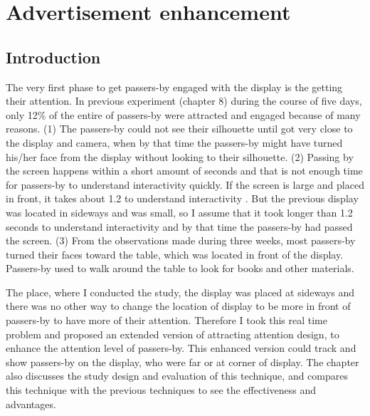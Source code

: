 \chapter{Advertisement enhancement} %

\label{Chapter9} %
\newpage

\section{Introduction}

The very first phase to get passers-by engaged with the display is the getting their attention. In previous experiment (chapter 8) during the course of five days, only 12\% of the entire of passers-by were attracted and engaged because of many reasons. (1) The passers-by could not see their silhouette until got very close to the display and camera, when by that time the passers-by might have turned his/her face from the display without looking to their silhouette. (2) Passing by the screen happens within a short amount of seconds and that is not enough time for passers-by to understand interactivity quickly. If the screen is large and placed in front, it takes about 1.2 to understand interactivity \cite{LookingGlass}. But the previous display was located in sideways and was small, so I assume that it took longer than 1.2 seconds to understand interactivity and by that time the passers-by had passed the screen. (3) From the observations made during three weeks, most passers-by turned their faces toward the table, which was located in front of the display. Passers-by used to walk around the table to look for books and other materials. 

The place, where I conducted the study, the display was placed at sideways and there was no other way to change the location of display to be more in front of passers-by to have more of their attention. Therefore I took this real time problem and proposed an extended version of attracting attention design, to enhance the attention level of passers-by. This enhanced version could track and show passers-by on the display, who were far or at corner of display. The chapter also discusses the study design and evaluation of this technique, and compares this technique with the previous techniques to see the effectiveness and advantages.



